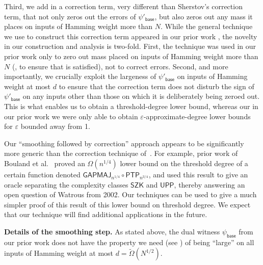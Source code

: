 \documentclass{toc}
\newcommand{\eps}{\varepsilon}
\begin{document}
Third, we add in a correction term, very different than Sherstov's correction term, that not only zeros out the errors of $\psi'_{\textsf{base}}$,
but also zeros out any mass it places on inputs of Hamming weight more than $N$. While the general technique we use to construct
this correction term appeared in our prior %
work \cite{adegsurj, bkt}, the novelty in our construction and analysis is two-fold.
First, the technique was used in our prior work only to zero out mass placed on inputs of Hamming weight more than $N$ (\ie, to ensure that
 is satisfied), not to correct errors. Second, and more importantly, 
we crucially exploit the largeness of $\psi'_{\textsf{base}}$ on inputs of Hamming weight at most $d$ to
ensure that the correction term does not disturb the sign of $\psi'_{\textsf{base}}$ on any inputs other 
than those on which it is deliberately being zeroed out. This is what enables us 
to obtain a %
threshold-degree  %
lower bound, whereas our
%
in our prior work we %
were only able to obtain %
$\eps$-approximate-degree %
lower bounds for $\eps$ bounded away from 1. 

\medskip
Our ``smoothing followed by correction'' approach appears to be significantly more generic than the correction technique of~\cite{sherstov15}. For example, prior work of Bouland et al.~\cite{bchtv} proved an $\Omega(n^{1/4})$ lower bound on the threshold degree of a certain function denoted $\mathsf{GAPMAJ}_{n^{1/4}} \circ \mathsf{PTP}_{n^{3/4}}$, and used this result to give an oracle separating the complexity classes $\textsf{SZK}$ and $\textsf{UPP}$, thereby answering
an open question of Watrous from 2002. Our techniques can be used to give a 
much simpler proof of this result of this %
lower bound on threshold degree. %
We expect that our technique will find additional applications in the future. 

\medskip \noindent \textbf{Details of the smoothing step.}
As stated above, the dual witness $\psi_{\textsf{base}}$ from our prior work
does not %
have %
the property we need
%
(see )  %
of being ``large'' on all inputs of Hamming weight at most
$d=\tilde{\Omega}(N^{1/2})$. 
\end{document}
